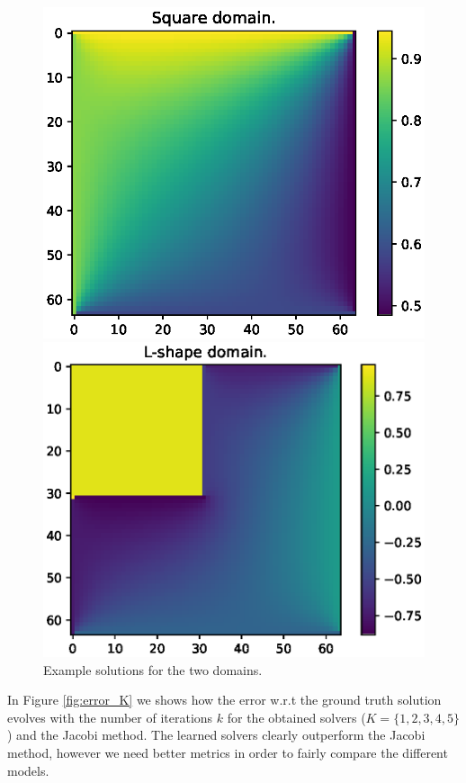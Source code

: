 \documentclass{rescience} %
\begin{document}
\begin{figure}[]
    \centering
    \begin{minipage}{.5\textwidth}
        \centering
        \includegraphics[width=0.8\linewidth]{figs/square.eps}
    \end{minipage}%
    \begin{minipage}{0.5\textwidth}
        \centering
        \includegraphics[width=0.8\linewidth]{figs/l_shape.eps}
    \end{minipage}
    \caption{Example solutions for the two domains.}
    \label{fig:example_solutions}
\end{figure}

In Figure \ref{fig:error_K} we shows how the error w.r.t the ground truth solution evolves with the number of iterations $k$ for the obtained solvers ($K=\{1,2,3,4,5\}$) and the Jacobi method. The learned solvers clearly outperform the Jacobi method, however we need better metrics in order to fairly compare the different models.
\end{document}
